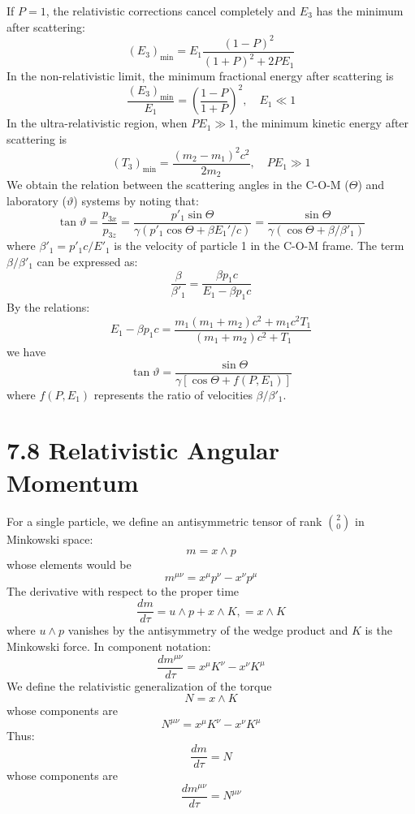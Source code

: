 \documentclass{article}
\begin{document}
    If $P=1$, the relativistic corrections cancel completely and $E_3$ has the minimum after scattering:
    $$ (E_3)_{\min} = E_1 \frac{(1-P)^2}{(1+P)^2+2PE_1} $$
    In the non-relativistic limit, the minimum fractional energy after scattering is
    $$ \frac{(E_3)_{\min}}{E_1} = \left(\frac{1-P}{1+P}\right)^2, \quad E_1 \ll 1 $$
    In the ultra-relativistic region, when $PE_1 \gg 1$, the minimum kinetic energy after scattering is
    $$ (T_3)_{\min} = \frac{(m_2-m_1)^2 c^2}{2m_2}, \quad PE_1 \gg 1 $$
    We obtain the relation between the scattering angles in the C-O-M ($\Theta$) and laboratory ($\vartheta$) systems by noting that:
    $$ \tan\vartheta = \frac{p_{3x}}{p_{3z}} = \frac{p'_1 \sin\Theta}{\gamma(p'_1 \cos\Theta + \beta E_1'/c)} = \frac{\sin\Theta}{\gamma(\cos\Theta + \beta/\beta'_1)} $$
    where $\beta'_1 = p'_1 c / E'_1$ is the velocity of particle 1 in the C-O-M frame.
    The term $\beta/\beta'_1$ can be expressed as:
    $$ \frac{\beta}{\beta'_1} = \frac{\beta p_1 c}{E_1 - \beta p_1 c} $$
    By the relations:
    $$ E_1 - \beta p_1 c = \frac{m_1(m_1+m_2)c^2 + m_1c^2 T_1}{(m_1+m_2)c^2 + T_1} $$
    we have
    $$ \tan\vartheta = \frac{\sin\Theta}{\gamma\left[\cos\Theta + f(P,E_1)\right]} $$
    where $f(P,E_1)$ represents the ratio of velocities $\beta/\beta'_1$.
    
    \section*{7.8 Relativistic Angular Momentum}
    
    For a single particle, we define an antisymmetric tensor of rank $\binom{2}{0}$ in Minkowski space:
    $$ m = x \wedge p $$
    whose elements would be
    $$ m^{\mu\nu} = x^\mu p^\nu - x^\nu p^\mu $$
    The derivative with respect to the proper time
    $$ \frac{dm}{d\tau} = u \wedge p + x \wedge K, = x \wedge K $$
    where $u \wedge p$ vanishes by the antisymmetry of the wedge product and $K$ is the Minkowski force.
    In component notation:
    $$ \frac{dm^{\mu\nu}}{d\tau} = x^\mu K^\nu - x^\nu K^\mu $$
    We define the relativistic generalization of the torque
    $$ N = x \wedge K $$
    whose components are
    $$ N^{\mu\nu} = x^\mu K^\nu - x^\nu K^\mu $$
    Thus:
    $$ \frac{dm}{d\tau} = N $$
    whose components are
    $$ \frac{dm^{\mu\nu}}{d\tau} = N^{\mu\nu} $$
    
\end{document}
